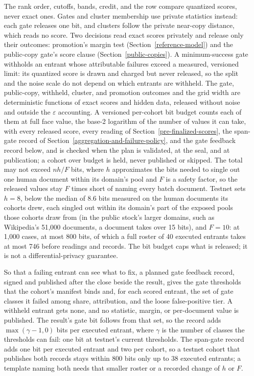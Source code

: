 The rank order, cutoffs, bands, credit, and the row compare quantized scores,
never exact ones. Gates and cluster membership use private statistics instead:
each gate releases one bit, and clusters follow the private near-copy distance,
which reads no score. Two decisions read
exact scores privately and release only their outcomes: promotion's margin test
(Section~\ref{reference-model}) and the public-copy gate's score clause
(Section~\ref{public-copies}). A minimum-success gate withholds an entrant whose attributable
failures exceed a measured, versioned limit: its quantized score is drawn and
charged but never released, so the split and the noise scale do not depend on
which entrants are withheld. The gate, public-copy, withheld, cluster, and
promotion outcomes and the grid width are deterministic functions of exact
scores and hidden data, released without noise and outside the
\(\varepsilon\) accounting. A versioned per-cohort bit budget counts each of
them at full face value, the base-2 logarithm of the number of values it can
take, with every released score, every reading of
Section~\ref{pre-finalized-scores}, the span-gate record of
Section~\ref{aggregation-and-failure-policy}, and the gate feedback record
below, and is checked when the plan is validated, at the seal, and at
publication; a cohort over budget is held, never published or skipped. The
total may not exceed \(nh/F\) bits, where \(h\) approximates the bits needed
to single out one human document within its domain's pool and \(F\) is a
safety factor, so the released values stay \(F\) times short of naming every
batch document. Testnet sets \(h=8\), below the median of 8.6 bits measured on
the human documents its cohorts drew, each singled out within its domain's
part of the exposed pools those cohorts draw from (in the public stock's larger
domains, such as Wikipedia's 51,000 documents, a document takes over 15 bits),
and \(F=10\): at 1,000 cases, at most 800
bits, of which a full roster of 40 executed entrants takes at most 746 before
readings and records. The bit budget caps what is released; it is not a
differential-privacy guarantee.

So that a failing entrant can see what to fix, a planned gate feedback record,
signed and published after the close beside the result, gives the gate
thresholds that the cohort's manifest binds and, for each scored entrant, the
set of gate classes it failed among share, attribution, and the loose
false-positive tier. A withheld entrant gets none, and no statistic, margin,
or per-document value is published. The result's gate bit follows from that
set, so the record adds \(\max(\gamma-1,0)\) bits per executed entrant, where
\(\gamma\) is the number of classes the thresholds can fail: one bit at testnet's
current thresholds. The span-gate record adds one bit per executed entrant and
two per cohort, so a testnet cohort that publishes both records stays within
800 bits only up to 38 executed entrants; a template naming both needs that
smaller roster or a recorded change of \(h\) or \(F\).

